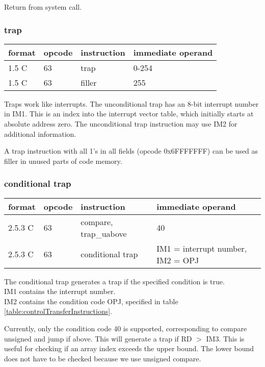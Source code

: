 \documentclass[forwardcom.tex]{subfiles}
\begin{document}
Return from system call.

\subsubsection{trap}
\label{traps}
\label{table:trapInstruction}
\begin{tabular}{|p{12mm}|p{12mm}|p{30mm}|p{80mm}|}
\hline
\bfseries format & \bfseries opcode & \bfseries instruction & \bfseries immediate operand \\ \hline
1.5 C & 63 & trap & 0-254 \\ \hline
1.5 C & 63 & filler & 255 \\ \hline
\end{tabular}
\vspace{2mm}

Traps work like interrupts. The unconditional trap has an 8-bit interrupt number in IM1. This is an index into the interrupt vector table, which initially starts at absolute address zero. The unconditional trap instruction may use IM2 for additional information.  
\vspace{2mm}

A trap instruction with all 1's in all fields (opcode 0x6FFFFFFF) can be used as filler in unused parts of code memory.

\subsubsection{conditional trap}
\label{table:conditionalTrapInstructions}
\begin{tabular}{|p{12mm}|p{12mm}|p{30mm}|p{80mm}|}
\hline
\bfseries format & \bfseries opcode & \bfseries instruction & \bfseries immediate operand \\ \hline
2.5.3 C & 63 & compare, trap\_uabove & 40 \\ \hline
2.5.3 C & 63 & conditional trap & IM1 = interrupt number, IM2 = OPJ \\ \hline
\end{tabular}
\vspace{2mm}

The conditional trap generates a trap if the specified condition is true.\\
IM1 contains the interrupt number. \\
IM2 contains the condition code OPJ, specified in table  \ref{table:controlTransferInstructions}.
\vspace{2mm}

Currently, only the condition code 40 is supported, corresponding to compare unsigned and jump if above. This will generate a trap if RD $>$ IM3. This is useful for checking if an array index exceeds the upper bound. The lower bound does not have to be checked because we use unsigned compare. 
\end{document}
